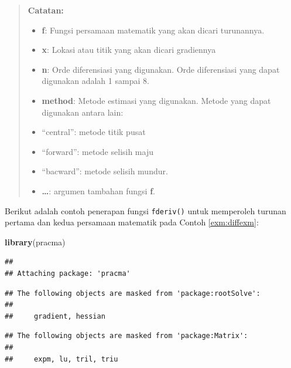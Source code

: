 \documentclass[
]{book}
\newenvironment{Shaded}{\begin{snugshade}}{\end{snugshade}}
\newcommand{\AttributeTok}[1]{\textcolor[rgb]{0.13,0.29,0.53}{#1}}
\newcommand{\CommentTok}[1]{\textcolor[rgb]{0.56,0.35,0.01}{\textit{#1}}}
\newcommand{\ControlFlowTok}[1]{\textcolor[rgb]{0.13,0.29,0.53}{\textbf{#1}}}
\newcommand{\DecValTok}[1]{\textcolor[rgb]{0.00,0.00,0.81}{#1}}
\newcommand{\FunctionTok}[1]{\textcolor[rgb]{0.13,0.29,0.53}{\textbf{#1}}}
\newcommand{\NormalTok}[1]{#1}
\newcommand{\SpecialCharTok}[1]{\textcolor[rgb]{0.81,0.36,0.00}{\textbf{#1}}}
\newcommand{\StringTok}[1]{\textcolor[rgb]{0.31,0.60,0.02}{#1}}
\providecommand{\tightlist}{%
  \setlength{\itemsep}{0pt}\setlength{\parskip}{0pt}}
\theoremstyle{definition}
\theoremstyle{definition}
\theoremstyle{definition}
\theoremstyle{definition}
\theoremstyle{remark}
\begin{document}
\begin{quote}
\textbf{Catatan:}

\begin{itemize}
\tightlist
\item
  \textbf{f}: Fungsi persamaan matematik yang akan dicari turunannya.
\item
  \textbf{x}: Lokasi atau titik yang akan dicari gradiennya
\item
  \textbf{n}: Orde diferensiasi yang digunakan. Orde diferensiasi yang dapat digunakan adalah 1 sampai 8.
\item
  \textbf{method}: Metode estimasi yang digunakan. Metode yang dapat digunakan antara lain:
\item
  ``central'': metode titik pusat
\item
  ``forward'': metode selisih maju
\item
  ``bacward'': metode selisih mundur.
\item
  \textbf{\ldots{}}: argumen tambahan fungsi \textbf{f}.
\end{itemize}
\end{quote}

Berikut adalah contoh penerapan fungsi \texttt{fderiv()} untuk memperoleh turunan pertama dan kedua persamaan matematik pada Contoh \ref{exm:diffexm}:

\begin{Shaded}
\begin{Highlighting}[]
\FunctionTok{library}\NormalTok{(pracma)}
\end{Highlighting}
\end{Shaded}

\begin{verbatim}
## 
## Attaching package: 'pracma'
\end{verbatim}

\begin{verbatim}
## The following objects are masked from 'package:rootSolve':
## 
##     gradient, hessian
\end{verbatim}

\begin{verbatim}
## The following objects are masked from 'package:Matrix':
## 
##     expm, lu, tril, triu
\end{verbatim}

\begin{Shaded}
\end{Shaded}
\end{document}
